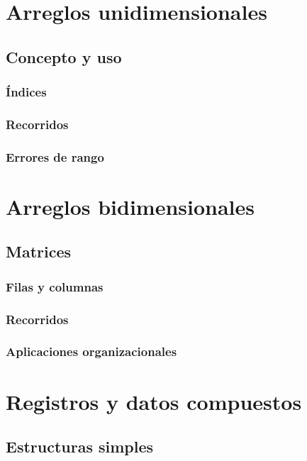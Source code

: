 \documentclass[12pt,twoside]{book}
\begin{document}
	\section{Arreglos unidimensionales}
	
	\subsection{Concepto y uso}
	
	\subsubsection{Índices}
	
	\subsubsection{Recorridos}
	
	\subsubsection{Errores de rango}
	
	\section{Arreglos bidimensionales}
	
	\subsection{Matrices}
	
	\subsubsection{Filas y columnas}
	
	\subsubsection{Recorridos}
	
	\subsubsection{Aplicaciones organizacionales}
	
	\section{Registros y datos compuestos}
	
	\subsection{Estructuras simples}
	
\end{document}
